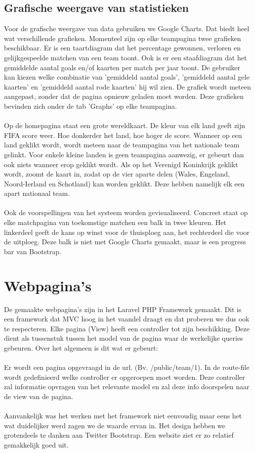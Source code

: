\documentclass[11pt, a4paper]{article}
\begin{document}
\subsection{Grafische weergave van statistieken}
Voor de grafische weergave van data gebruiken we Google Charts. Dat biedt heel wat verschillende grafieken. Momenteel zijn op elke teampagina twee grafieken beschikbaar. Er is een taartdiagram dat het percentage gewonnen, verloren en gelijkgespeelde matchen van een team toont. Ook is er een staafdiagram dat het gemiddelde aantal goals en/of kaarten per match per jaar toont. De gebruiker kan kiezen welke combinatie van 'gemiddeld aantal goals', 'gemiddeld aantal gele kaarten' en 'gemiddeld aantal rode kaarten' hij wil zien. De grafiek wordt meteen aangepast, zonder dat de pagina opnieuw geladen moet worden. Deze grafieken bevinden zich onder de tab 'Graphs' op elke teampagina. \\ \\
Op de homepagina staat een grote wereldkaart. De kleur van elk land geeft zijn FIFA score weer. Hoe donkerder het land, hoe hoger de score. Wanneer op een land geklikt wordt, wordt meteen naar de teampagina van het nationale team gelinkt. Voor enkele kleine landen is geen teampagina aanwezig, er gebeurt dan ook niets wanneer erop geklikt wordt. Als op het Verenigd Koninkrijk geklikt wordt, zoomt de kaart in, zodat op de vier aparte delen (Wales, Engeland, Noord-Ierland en Schotland) kan worden geklikt. Deze hebben namelijk elk een apart nationaal team. \\ \\
Ook de voorspellingen van het systeem worden gevisualiseerd. Concreet staat op elke matchpagina van toekomstige matchen een balk in twee kleuren. Het linkerdeel geeft de kans op winst voor de thuisploeg aan, het rechterdeel die voor de uitploeg. Deze balk is niet met Google Charts gemaakt, maar is een progress bar van Bootstrap.
\section{Webpagina's}
De gemaakte webpagina's zijn in het Laravel PHP Framework gemaakt. Dit is een framework dat MVC hoog in het vaandel draagt en dat proberen we dus ook te respecteren.
Elke pagina (View) heeft een controller tot zijn beschikking. Deze dient als tussenstuk tussen het model van de pagina waar de werkelijke queries gebeuren. Over het algemeen is dit wat er gebeurt:
\\
\\
Er wordt een pagina opgevraagd in de url. (Bv. /public/team/1). In de route-file wordt gedefinieerd welke controller er opgeroepen moet worden. Deze controller zal informatie opvragen van het
relevante model en zal deze info doorspelen naar de view van de pagina.
\\
\\
Aanvankelijk was het werken met het framework niet eenvoudig maar eens het wat duidelijker werd zagen we de waarde ervan in.
Het design hebben we grotendeels te danken aan Twitter Bootstrap. Een website ziet er zo relatief gemakkelijk goed uit.
\\
\\
\end{document}
